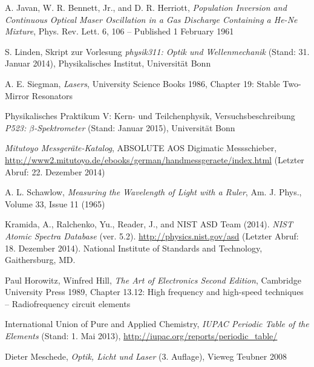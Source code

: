 \documentclass[11pt, a4paper]{article}
\numberwithin{equation}{section}
\begin{document}
\clearpage
\vspace{\fill}
\begin{thebibliography}{19}
	A. Javan, W. R. Bennett, Jr., and D. R. Herriott,
	\emph{Population Inversion and Continuous Optical Maser Oscillation in a Gas Discharge Containing a He-Ne Mixture},
	Phys. Rev. Lett. 6, 106 – Published 1 February 1961

	S. Linden,
	Skript zur Vorlesung \emph{physik311: Optik und Wellenmechanik} (Stand: 31. Januar 2014),
	Physikalisches Institut, Universität Bonn

	A. E. Siegman,
	\emph{Lasers},
	University Science Books 1986,
	Chapter 19: Stable Two-Mirror Resonators

	Physikalisches Praktikum V: Kern- und Teilchenphysik,
	Versuchsbeschreibung \emph{P523: $\beta$-Spektrometer} (Stand: Januar 2015),
	Universität Bonn
	
	\emph{Mitutoyo Messgeräte-Katalog},
	ABSOLUTE AOS Digimatic Messschieber,\\
	\url{http://www2.mitutoyo.de/ebooks/german/handmessgeraete/index.html} (Letzter Abruf: 22. Dezember 2014)	

	A. L. Schawlow,
	\emph{Measuring the Wavelength of Light with a Ruler},
	Am. J. Phys., Volume 33, Issue 11 (1965)

	Kramida, A., Ralchenko, Yu., Reader, J., and NIST ASD Team (2014).
	\emph{NIST Atomic Spectra Database} (ver. 5.2).
	\url{http://physics.nist.gov/asd} (Letzter Abruf: 18. Dezember 2014).
	National Institute of Standards and Technology, Gaithersburg, MD.
	
	Paul Horowitz, Winfred Hill,
	\emph{The Art of Electronics Second Edition},
	Cambridge University Press 1989,
	Chapter 13.12: High frequency and high-speed techniques -- Radiofrequency circuit elements

	International Union of Pure and Applied Chemistry,
	\emph{IUPAC Periodic Table of the Elements} (Stand: 1. Mai 2013),
	\url{http://iupac.org/reports/periodic_table/}

	Dieter Meschede,
	\emph{Optik, Licht und Laser} (3. Auflage),
	Vieweg Teubner 2008
	
	
 
\end{thebibliography}
\end{document}
